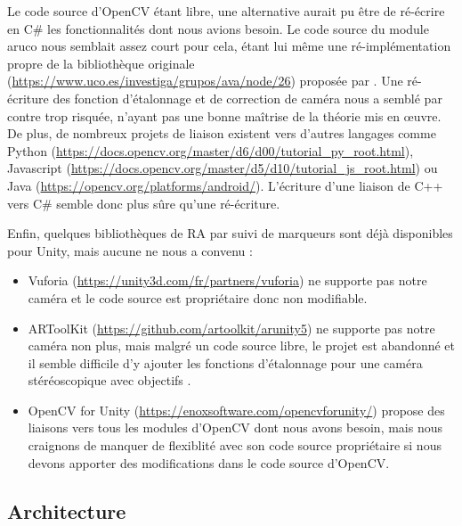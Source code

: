 Le code source d'OpenCV étant libre, une alternative aurait pu être de ré-écrire en C\# les fonctionnalités dont nous avions besoin. Le code source du module aruco nous semblait assez court pour cela, étant lui même une ré-implémentation propre de la bibliothèque originale (\url{https://www.uco.es/investiga/grupos/ava/node/26}) proposée par \cite{Garrido-Jurado2014}. Une ré-écriture des fonction d'étalonnage et de correction de caméra nous a semblé par contre trop risquée, n'ayant pas une bonne maîtrise de la théorie mis en \oe uvre. De plus, de nombreux projets de liaison existent vers d'autres langages comme Python (\url{https://docs.opencv.org/master/d6/d00/tutorial_py_root.html}), Javascript (\url{https://docs.opencv.org/master/d5/d10/tutorial_js_root.html}) ou Java (\url{https://opencv.org/platforms/android/}). L'écriture d'une liaison de C++ vers C\# semble donc plus sûre qu'une ré-écriture.

Enfin, quelques bibliothèques de RA par suivi de marqueurs sont déjà disponibles pour Unity, mais aucune ne nous a convenu :
\begin{itemize}
  \item Vuforia (\url{https://unity3d.com/fr/partners/vuforia}) ne supporte pas notre caméra et le code source est propriétaire donc non modifiable.
  \item ARToolKit (\url{https://github.com/artoolkit/arunity5}) ne supporte pas notre caméra non plus, mais malgré un code source libre, le projet est abandonné et il semble difficile d'y ajouter les fonctions d'étalonnage pour une caméra stéréoscopique avec objectifs .
  \item OpenCV for Unity (\url{https://enoxsoftware.com/opencvforunity/}) propose des liaisons vers tous les modules d'OpenCV dont nous avons besoin, mais nous craignons de manquer de flexiblité avec son code source propriétaire si nous devons apporter des modifications dans le code source d'OpenCV.
\end{itemize}

\subsection{Architecture}
\label{subsec:aruco_unity_architecture}

